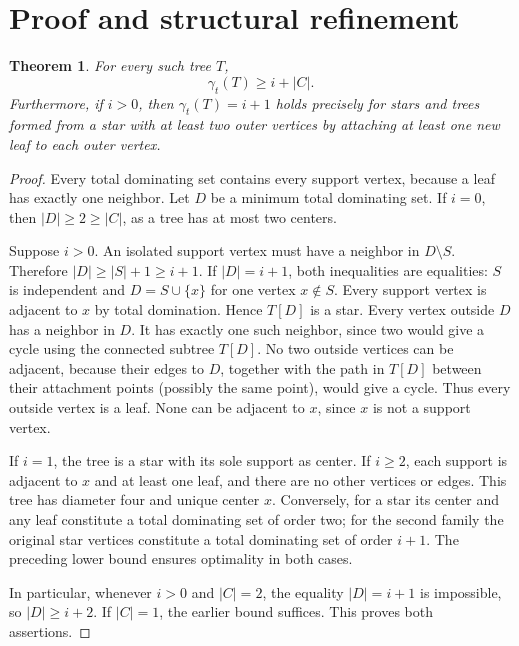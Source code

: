 \documentclass[11pt]{article}
\newtheorem{theorem}{Theorem}
\begin{document}
\section{Proof and structural refinement}
\begin{theorem}
For every such tree $T$,
\[
\gamma_t(T)\ge i+|C|.
\]
Furthermore, if $i>0$, then $\gamma_t(T)=i+1$ holds precisely for stars and trees formed from a star with at least two outer vertices by attaching at least one new leaf to each outer vertex.
\end{theorem}
\begin{proof}
Every total dominating set contains every support vertex, because a leaf has exactly one neighbor. Let $D$ be a minimum total dominating set. If $i=0$, then $|D|\ge2\ge |C|$, as a tree has at most two centers.

Suppose $i>0$. An isolated support vertex must have a neighbor in $D\setminus S$. Therefore $|D|\ge |S|+1\ge i+1$. If $|D|=i+1$, both inequalities are equalities: $S$ is independent and $D=S\cup\{x\}$ for one vertex $x\notin S$. Every support vertex is adjacent to $x$ by total domination. Hence $T[D]$ is a star. Every vertex outside $D$ has a neighbor in $D$. It has exactly one such neighbor, since two would give a cycle using the connected subtree $T[D]$. No two outside vertices can be adjacent, because their edges to $D$, together with the path in $T[D]$ between their attachment points (possibly the same point), would give a cycle. Thus every outside vertex is a leaf. None can be adjacent to $x$, since $x$ is not a support vertex.

If $i=1$, the tree is a star with its sole support as center. If $i\ge2$, each support is adjacent to $x$ and at least one leaf, and there are no other vertices or edges. This tree has diameter four and unique center $x$. Conversely, for a star its center and any leaf constitute a total dominating set of order two; for the second family the original star vertices constitute a total dominating set of order $i+1$. The preceding lower bound ensures optimality in both cases.

In particular, whenever $i>0$ and $|C|=2$, the equality $|D|=i+1$ is impossible, so $|D|\ge i+2$. If $|C|=1$, the earlier bound suffices. This proves both assertions.
\end{proof}
\end{document}
